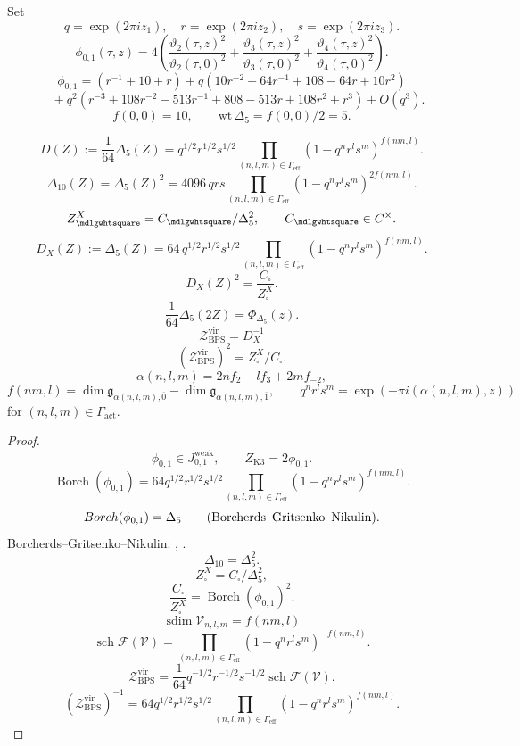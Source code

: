 \documentclass[11pt]{memoir}
\newcommand{\sdim}{\operatorname{sdim}}
\newcommand{\sch}{\operatorname{sch}}
\begin{document}
\begin{theorem}[$N=1$ determinant--denominator square root]
Set
$$q=\exp(2\pi i z_1), \quad r=\exp(2\pi i z_2), \quad
s=\exp(2\pi i z_3).$$
$$\phi_{0,1}(\tau,z)
=4\left(\frac{\vartheta_2(\tau,z)^2}{\vartheta_2(\tau,0)^2}
+\frac{\vartheta_3(\tau,z)^2}{\vartheta_3(\tau,0)^2}
+\frac{\vartheta_4(\tau,z)^2}{\vartheta_4(\tau,0)^2}\right).$$
$$\phi_{0,1}
= (r^{-1}+10+r)
+q(10r^{-2}-64r^{-1}+108-64r+10r^2)$$
$$\quad
+q^2(r^{-3}+108r^{-2}-513r^{-1}+808-513r+108r^2+r^3)
+O(q^3).$$
$$f(0,0)=10,\qquad \mathrm{wt}\,\Delta_5=f(0,0)/2=5.$$

$$D(Z):=\frac{1}{64}\Delta_5(Z)
=q^{1/2}r^{1/2}s^{1/2}
\prod_{(n,l,m)\in\Gamma_{\mathrm{eff}}}
(1-q^nr^ls^m)^{f(nm,l)}.$$
$$\Delta_{10}(Z)=\Delta_5(Z)^2
=4096\,qrs\prod_{(n,l,m)\in\Gamma_{\mathrm{eff}}}
(1-q^nr^ls^m)^{2f(nm,l)}.$$
$$Z^X_{\square}=C_{\square}/\Delta_5^2,\qquad
C_{\square}\in\C^\times.$$
$$D_X(Z):=\Delta_5(Z)
=64\,q^{1/2}r^{1/2}s^{1/2}
\prod_{(n,l,m)\in\Gamma_{\mathrm{eff}}}
(1-q^nr^ls^m)^{f(nm,l)}.$$
$$D_X(Z)^2=\frac{C_{\square}}{Z^X_{\square}}.$$
$$\frac1{64}\Delta_5(2Z)=\Phi_{\Delta_5}(z).$$
$$\mathcal Z_{\mathrm{BPS}}^{\mathrm{vir}}
=D_X^{-1}$$
$$\left(\mathcal Z_{\mathrm{BPS}}^{\mathrm{vir}}\right)^2
=Z^X_{\square}/C_{\square}.$$
$$\alpha(n,l,m)=2nf_2-lf_3+2mf_{-2},$$
$$f(nm,l)=\dim \mathfrak{g}_{\alpha(n,l,m),\overline 0}
-\dim \mathfrak{g}_{\alpha(n,l,m),\overline 1}, \qquad
q^nr^ls^m=\exp(-\pi i(\alpha(n,l,m),z))$$
for $(n,l,m)\in\Gamma_{\mathrm{act}}$.
\end{theorem}

\begin{proof}
$$\phi_{0,1}\in J^{\mathrm{weak}}_{0,1},\qquad
Z_{\mathrm{K3}}=2\phi_{0,1}.$$
$$\operatorname{Borch}(\phi_{0,1})
=64q^{1/2}r^{1/2}s^{1/2}
\prod_{(n,l,m)\in\Gamma_{\mathrm{eff}}}
(1-q^nr^ls^m)^{f(nm,l)}.$$
$$\operatorname{Borch}(\phi_{0,1})=\Delta_5
\qquad(\hbox{Borcherds--Gritsenko--Nikulin}).$$
Borcherds--Gritsenko--Nikulin: \cite{B}, \cite{GN}.
$$\Delta_{10}=\Delta_5^2.$$
$$Z^X_{\square}=C_{\square}/\Delta_5^2,$$
$$\frac{C_{\square}}{Z^X_{\square}}
=\operatorname{Borch}(\phi_{0,1})^2.$$
$$\sdim\mathcal V_{n,l,m}=f(nm,l)$$
$$\sch\mathcal F(\mathcal V)
=\prod_{(n,l,m)\in\Gamma_{\mathrm{eff}}}
(1-q^nr^ls^m)^{-f(nm,l)}.$$
$$\mathcal Z_{\mathrm{BPS}}^{\mathrm{vir}}
=\frac1{64}q^{-1/2}r^{-1/2}s^{-1/2}\sch\mathcal F(\mathcal V).$$
$$\left(\mathcal Z_{\mathrm{BPS}}^{\mathrm{vir}}\right)^{-1}
=64q^{1/2}r^{1/2}s^{1/2}
\prod_{(n,l,m)\in\Gamma_{\mathrm{eff}}}
(1-q^nr^ls^m)^{f(nm,l)}.$$
\end{proof}
\end{document}
